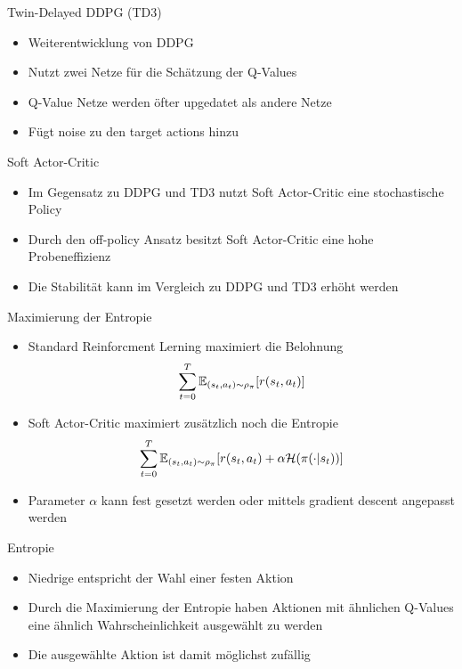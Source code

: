 \begin{frame}{Twin-Delayed DDPG (TD3)}
	\begin{itemize}
		\item Weiterentwicklung von DDPG
		\item Nutzt zwei Netze für die Schätzung der Q-Values
		\item Q-Value Netze werden öfter upgedatet als andere Netze
		\item Fügt noise zu den target actions hinzu
	\end{itemize} 
\end{frame}

\begin{frame}{Soft Actor-Critic}
	\begin{itemize}
		\item Im Gegensatz zu DDPG und TD3 nutzt Soft Actor-Critic eine stochastische Policy
		\item Durch den off-policy Ansatz besitzt Soft Actor-Critic eine hohe Probeneffizienz 
		\item Die Stabilität kann im Vergleich zu DDPG und TD3 erhöht werden 
	\end{itemize} 
\end{frame}

\begin{frame}{Maximierung der Entropie}
	\begin{itemize}
		\item Standard Reinforcment Lerning maximiert die Belohnung
		\begin{equation}
			\sum_{t=0}^T \mathbb{E}_{(s_t,a_t)\sim\rho_\pi}[{\mathnormal{r}(s_t,a_t)}] \notag
		\end{equation}
		\item Soft Actor-Critic maximiert zusätzlich noch die Entropie
		\begin{equation}
			\sum_{t=0}^T \mathbb{E}_{(s_t,a_t)\sim\rho_\pi}[{\mathnormal{r}(s_t,a_t)} + \alpha \mathcal{H}(\pi(\cdot|s_t))] \notag
		\end{equation}
	\item Parameter $\alpha$ kann fest gesetzt werden oder mittels gradient descent angepasst werden
	\end{itemize} 
\end{frame}

\begin{frame}{Entropie}
	\begin{itemize}
		\item Niedrige entspricht der Wahl einer festen Aktion
		\item Durch die Maximierung der Entropie haben Aktionen mit ähnlichen Q-Values eine ähnlich Wahrscheinlichkeit ausgewählt zu werden
		\item Die ausgewählte Aktion ist damit möglichst zufällig
	\end{itemize} 
\end{frame}

